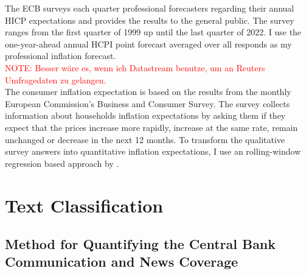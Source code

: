 \documentclass[review]{elsarticle}
\begin{document}
The ECB surveys each quarter professional forecasters regarding their annual HICP expectations and provides the results to the general public. The survey ranges from the first quarter of 1999 up until the last quarter of 2022. I use the one-year-ahead annual HCPI point forecast averaged over all responds as my professional inflation forecast. 
\\
\textcolor{red}{NOTE: Besser wäre es, wenn ich Datastream benutze, um an Reuters Umfragedaten zu gelangen.}
\\
The consumer inflation expectation is based on the results from the monthly European Commission’s Business and Consumer Survey. The survey collects information about households inflation expectations by asking them if they expect that the prices increase more rapidly, increase at the same rate, remain unchanged or decrease in the next 12 months. To transform the qualitative survey answers into quantitative inflation expectations, I use an rolling-window regression based approach by \cite{Lahiri2015}. 


\section{Text Classification} \label{sec:Text Classification}

\subsection{Method for Quantifying the Central Bank Communication and News Coverage}
\end{document}
